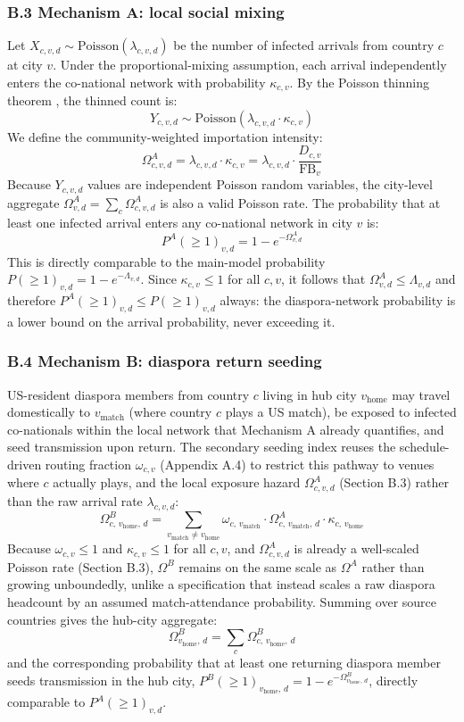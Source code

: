 \documentclass[12pt, a4paper]{article}
\begin{document}
\subsubsection*{B.3 Mechanism A: local social mixing}

Let $X_{c,v,d} \sim \text{Poisson}(\lambda_{c,v,d})$ be the number
of infected arrivals from country $c$ at city $v$. Under the
proportional-mixing assumption, each arrival independently enters
the co-national network with probability $\kappa_{c,v}$. By the
Poisson thinning theorem \citep{Ross2010}, the thinned count is:
\[
  Y_{c,v,d} \sim \text{Poisson}(\lambda_{c,v,d} \cdot \kappa_{c,v})
\]
We define the community-weighted importation intensity:
\[
  \Omega^A_{c,v,d} = \lambda_{c,v,d} \cdot \kappa_{c,v}
    = \lambda_{c,v,d} \cdot \frac{D_{c,v}}{\mathrm{FB}_{v}}
\]
Because $Y_{c,v,d}$ values are independent Poisson random variables,
the city-level aggregate $\Omega^A_{v,d} = \sum_c \Omega^A_{c,v,d}$
is also a valid Poisson rate. The probability that at least one
infected arrival enters any co-national network in city $v$ is:
\[
  P^A(\geq 1)_{v,d} = 1 - e^{-\Omega^A_{v,d}}
\]
This is directly comparable to the main-model probability
$P(\geq 1)_{v,d} = 1 - e^{-\Lambda_{v,d}}$. Since
$\kappa_{c,v} \leq 1$ for all $c,v$, it follows that
$\Omega^A_{v,d} \leq \Lambda_{v,d}$ and therefore
$P^A(\geq 1)_{v,d} \leq P(\geq 1)_{v,d}$ always: the
diaspora-network probability is a lower bound on the arrival
probability, never exceeding it.

\subsubsection*{B.4 Mechanism B: diaspora return seeding}

US-resident diaspora members from country $c$ living in hub city
$v_{\text{home}}$ may travel domestically to $v_{\text{match}}$
(where country $c$ plays a US match), be exposed to infected
co-nationals within the local network that Mechanism A already
quantifies, and seed transmission upon return. The secondary seeding
index reuses the schedule-driven routing fraction $\omega_{c,v}$
(Appendix A.4) to restrict this pathway to venues where $c$ actually
plays, and the local exposure hazard $\Omega^A_{c,v,d}$ (Section B.3)
rather than the raw arrival rate $\lambda_{c,v,d}$:
\[
  \Omega^B_{c,\,v_{\text{home}},\,d}
    = \sum_{v_{\text{match}} \neq v_{\text{home}}}
      \omega_{c,\,v_{\text{match}}} \cdot \Omega^A_{c,\,v_{\text{match}},\,d}
      \cdot \kappa_{c,\,v_{\text{home}}}
\]
Because $\omega_{c,v} \leq 1$ and $\kappa_{c,v} \leq 1$ for all $c,v$,
and $\Omega^A_{c,v,d}$ is already a well-scaled Poisson rate
(Section B.3), $\Omega^B$ remains on the same scale as $\Omega^A$
rather than growing unboundedly, unlike a specification that instead
scales a raw diaspora headcount by an assumed match-attendance
probability. Summing over source countries gives the hub-city
aggregate:
\[
  \Omega^B_{v_{\text{home}},\,d} = \sum_c \Omega^B_{c,\,v_{\text{home}},\,d}
\]
and the corresponding probability that at least one returning
diaspora member seeds transmission in the hub city,
$P^B(\geq 1)_{v_{\text{home}},\,d} = 1 - e^{-\Omega^B_{v_{\text{home}},\,d}}$,
directly comparable to $P^A(\geq 1)_{v,d}$.
\end{document}
